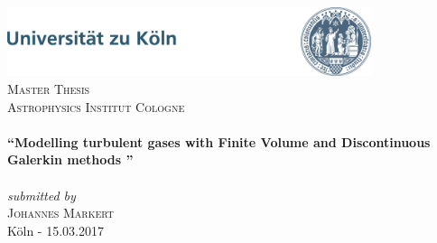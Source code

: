 \newcommand{\expNr}{04}
\newcommand{\expTitle}{}
\newcommand{\releaseDate}{15.03.2017}

\begin{titlepage}
\begin{center}

\includegraphics[width=0.8\textwidth]{./frp/uni_koeln_logo.jpg}\\[1.0cm]  

\textsc{\LARGE Master Thesis}
\textsc{\Large }\\[0.8cm]
\textsc{\Large Astrophysics Institut Cologne}\\[0.5cm]

\HRule\\[0.7cm]
{ \LARGE \bfseries \textquotedblleft Modelling turbulent gases with Finite Volume and Discontinuous Galerkin methods \textquotedblright}\\[0.4cm]
\HRule \\[0.7cm]

\large \emph{submitted by}\\[0.4cm]
\textsc{\LARGE Johannes Markert}\\[1cm]

\vfill
K\"oln - \releaseDate 

\end{center}
\end{titlepage}


\cleardoubleemptypage
